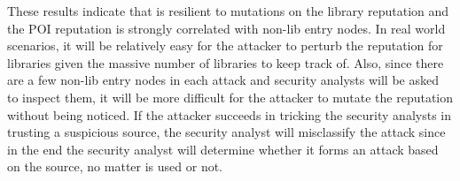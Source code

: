 {These results indicate that \tool is resilient to mutations on the library reputation and the POI reputation is strongly correlated with non-lib entry nodes.
In real world scenarios,
it will be relatively easy for the attacker to perturb the reputation for libraries given the massive number of libraries to keep track of. 
Also, since there are a few non-lib entry nodes in each attack and security analysts will be asked to inspect them, it will be more difficult for the attacker to mutate the reputation without being noticed.
If the attacker succeeds in tricking the security analysts in trusting a suspicious source, the security analyst will misclassify the attack since in the end the security analyst will determine whether it forms an attack based on the source,
no matter \tool is used or not.
}


